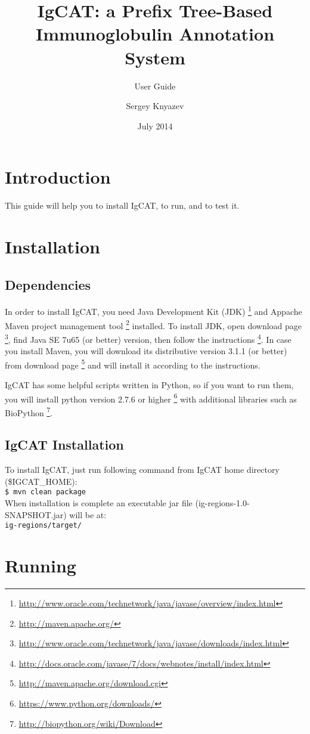 \documentclass{scrartcl}
\title{IgCAT: a Prefix Tree-Based Immunoglobulin Annotation System}
\subtitle{User Guide}
\author{Sergey Knyazev}
\date{July 2014}
\newcommand{\shellcmd}[1]{\\\indent\indent\texttt{\footnotesize #1}\\}
\begin{document}
\maketitle

\section{Introduction}
This guide will help you to install IgCAT\cite{Yakovlev2014}, to run, and to test it.

\section{Installation}
\subsection{Dependencies}
In order to install IgCAT, you need Java Development Kit (JDK)
\footnote{\url{http://www.oracle.com/technetwork/java/javase/overview/index.html}} and
Appache Maven project management tool \footnote{\url{http://maven.apache.org/}} installed.
To install JDK, open download page
\footnote{\url{http://www.oracle.com/technetwork/java/javase/downloads/index.html}},
find Java SE 7u65 (or better) version, then follow the instructions
\footnote{\url{http://docs.oracle.com/javase/7/docs/webnotes/install/index.html}}.
In case you install Maven, you will download its distributive version 3.1.1 (or better)
from download page \footnote{\url{http://maven.apache.org/download.cgi}}
and will install it according to the instructions.

IgCAT has some helpful scripts written in Python, so if you want to run them,
you will install python version 2.7.6 or higher \footnote{\url{https://www.python.org/downloads/}}
with additional libraries such as BioPython \footnote{\url{http://biopython.org/wiki/Download}}. 

\subsection{IgCAT Installation}
To install IgCAT, just run following command from IgCAT home directory (\$IGCAT\_HOME):
\shellcmd{\$ mvn clean package}
When installation is complete an executable jar file (ig-regions-1.0-SNAPSHOT.jar) will be at:
\shellcmd{ig-regions/target/}

\section{Running}
\end{document}
